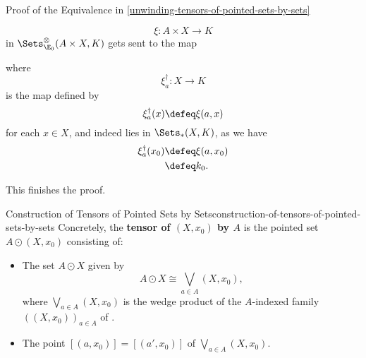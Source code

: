 \begin{Proof}{Proof of the Equivalence in \cref{unwinding-tensors-of-pointed-sets-by-sets}}
\begin{itemize}
\[                \xi%
                \colon%
                A\times X%
                \to%
                K%
            \]%
            in $\Sets^{\otimes}_{\E_{0}}(A\times X,K)$ gets sent to the map
            \begin{webcompile}
                \phantom{\xi^{\dagger}\colon}
            \end{webcompile}
            where
            \[
                \xi^{\dagger}_{a}%
                \colon%
                X
                \to%
                K%
            \]%
            is the map defined by
            \[
                \xi^{\dagger}_{a}(x)%
                \defeq%
                \xi(a,x)%
            \]%
            for each $x\in X$, and indeed lies in $\Sets_{*}(X,K)$, as we have%
            \begin{align*}
                \xi^{\dagger}_{a}(x_{0}) &\defeq \xi(a,x_{0})\\%
                                         &\defeq k_{0}.%
            \end{align*}
    \end{itemize}
    This finishes the proof.
\end{Proof}
\begin{construction}{Construction of Tensors of Pointed Sets by Sets}{construction-of-tensors-of-pointed-sets-by-sets}%
    Concretely, the \textbf{tensor of $(X,x_{0})$ by $A$} is the pointed set $A\odot(X,x_{0})$ consisting of:
    \begin{itemize}
        \item{}The set $A\odot X$ given by
            \[
                A\odot X%
                \cong%
                \bigvee_{a\in A}(X,x_{0}),%
            \]%
            where $\bigvee_{a\in A}(X,x_{0})$ is the wedge product of the $A$-indexed family $((X,x_{0}))_{a\in A}$ of .
        \item{}The point $[(a,x_{0})]=[(a',x_{0})]$ of $\bigvee_{a\in A}(X,x_{0})$.%
    \end{itemize}
\end{construction}

